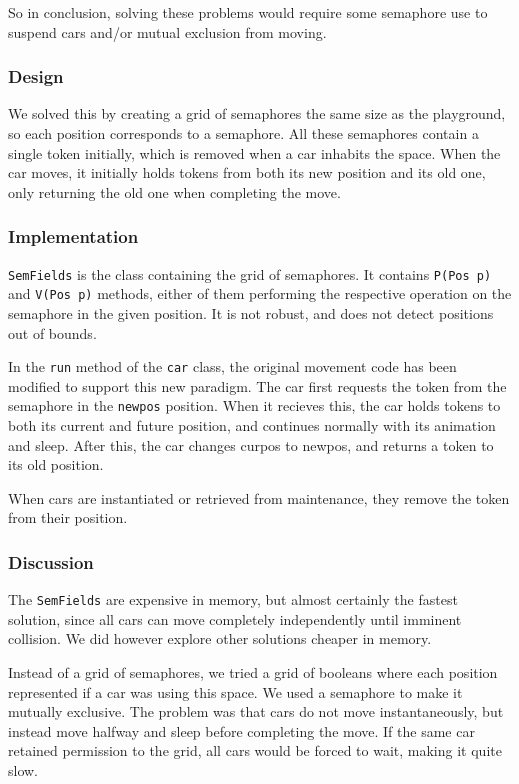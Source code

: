 So in conclusion, solving these problems would require some semaphore use to suspend cars and/or mutual exclusion from moving.

\subsubsection{Design}
We solved this by creating a grid of semaphores the same size as the playground, so each position corresponds to a semaphore. All these semaphores contain a single token initially, which is removed when a car inhabits the space. When the car moves, it initially holds tokens from both its new position and its old one, only returning the old one when completing the move.

\subsubsection{Implementation}
\texttt{SemFields} is the class containing the grid of semaphores. It contains \texttt{P(Pos p)} and \texttt{V(Pos p)} methods, either of them performing the respective operation on the semaphore in the given position. It is not robust, and does not detect positions out of bounds.

In the \texttt{run} method of the \texttt{car} class, the original movement code has been modified to support this new paradigm. The car first requests the token from the semaphore in the \texttt{newpos} position. When it recieves this, the car holds tokens to both its current and future position, and continues normally with its animation and sleep. After this, the car changes curpos to newpos, and returns a token to its old position.

When cars are instantiated or retrieved from maintenance, they remove the token from their position.

\subsubsection{Discussion}
The \texttt{SemFields} are expensive in memory, but almost certainly the fastest solution, since all cars can move completely independently until imminent collision. We did however explore other solutions cheaper in memory.

Instead of a grid of semaphores, we tried a grid of booleans where each position represented if a car was using this space. We used a semaphore to make it mutually exclusive. The problem was that cars do not move instantaneously, but instead move halfway and sleep before completing the move. If the same car retained permission to the grid, all cars would be forced to wait, making it quite slow.

